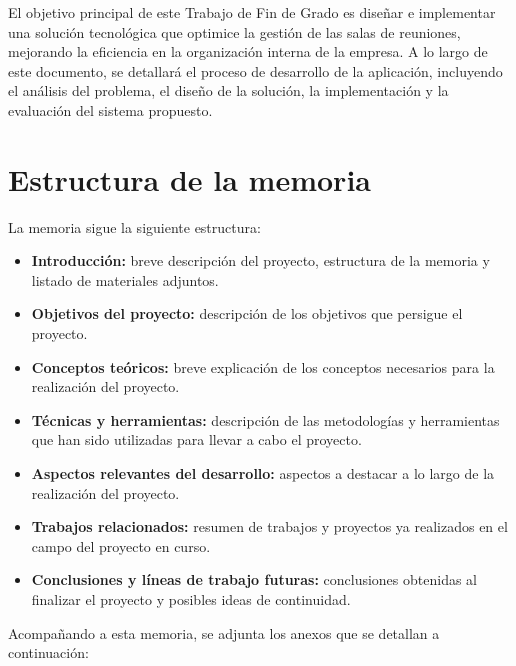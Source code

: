 El objetivo principal de este Trabajo de Fin de Grado es diseñar e implementar una solución tecnológica que optimice la gestión de las salas de reuniones, mejorando la eficiencia en la organización interna de la empresa. A lo largo de este documento, se detallará el proceso de desarrollo de la aplicación, incluyendo el análisis del problema, el diseño de la solución, la implementación y la evaluación del sistema propuesto.

\section{Estructura de la memoria}\label{estructura-de-la-memoria}

La memoria sigue la siguiente estructura:

\begin{itemize}
\tightlist
\item
  \textbf{Introducción:} breve descripción del proyecto, estructura de la memoria y listado de materiales adjuntos.
\item
  \textbf{Objetivos del proyecto:} descripción de los objetivos que persigue el proyecto.
\item
  \textbf{Conceptos teóricos:} breve explicación de los conceptos necesarios para la realización del proyecto.
\item
  \textbf{Técnicas y herramientas:} descripción de las metodologías y herramientas que han sido utilizadas para llevar a cabo el proyecto.
\item
  \textbf{Aspectos relevantes del desarrollo:} aspectos a destacar a lo largo de la realización del proyecto.
\item
  \textbf{Trabajos relacionados:} resumen de trabajos y proyectos ya realizados en el campo del proyecto en curso.
\item
  \textbf{Conclusiones y líneas de trabajo futuras:} conclusiones obtenidas al finalizar el proyecto y posibles ideas de continuidad.
\end{itemize}

Acompañando a esta memoria, se adjunta los anexos que se detallan a continuación:

